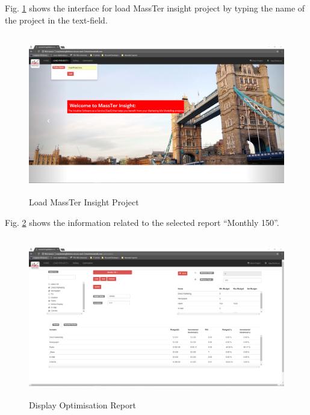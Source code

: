 Fig. \ref{LMIPscreentshots} shows the interface for load MassTer insight project by typing the name of the project in the text-field. 
\begin{figure}[!h]
	\centering
	\includegraphics[width=17cm,height=7cm]{3.png}
	\caption{Load MassTer Insight Project}	
	\label{LMIPscreentshots}
\end{figure} 
\clearpage
\newpage 
Fig. \ref{DORscreentshots} shows the information related to the selected report ``Monthly 150''.
\begin{figure}[!h]
	\centering
	\includegraphics[width=17cm,height=7cm]{4.png}
	\caption{Display Optimisation Report}
	\label{DORscreentshots}	
\end{figure}

